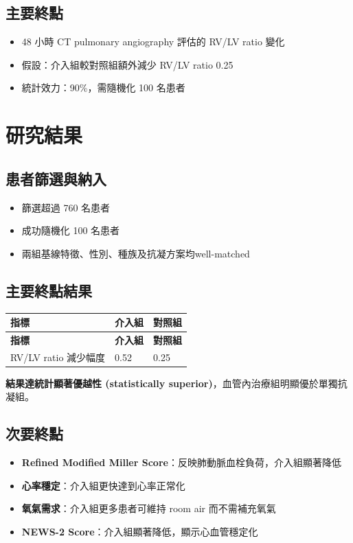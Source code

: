 \documentclass[12pt,a4paper]{article}
\begin{document}
\subsection{主要終點}
\begin{itemize}
    \item 48 小時 CT pulmonary angiography 評估的 RV/LV ratio 變化
    \item 假設：介入組較對照組額外減少 RV/LV ratio 0.25
    \item 統計效力：90\%，需隨機化 100 名患者
\end{itemize}

\section{研究結果}

\subsection{患者篩選與納入}
\begin{itemize}
    \item 篩選超過 760 名患者
    \item 成功隨機化 100 名患者
    \item 兩組基線特徵、性別、種族及抗凝方案均well-matched
\end{itemize}

\subsection{主要終點結果}

\begin{longtable}{p{6cm}p{4cm}p{4cm}}
\toprule
\textbf{指標} & \textbf{介入組} & \textbf{對照組} \\
\midrule
\endfirsthead
\toprule
\textbf{指標} & \textbf{介入組} & \textbf{對照組} \\
\midrule
\endhead
RV/LV ratio 減少幅度 & 0.52 & 0.25 \\
\bottomrule
\end{longtable}

\textbf{結果達統計顯著優越性 (statistically superior)}，血管內治療組明顯優於單獨抗凝組。

\subsection{次要終點}

\begin{itemize}
    \item \textbf{Refined Modified Miller Score}：反映肺動脈血栓負荷，介入組顯著降低
    \item \textbf{心率穩定}：介入組更快達到心率正常化
    \item \textbf{氧氣需求}：介入組更多患者可維持 room air 而不需補充氧氣
    \item \textbf{NEWS-2 Score}：介入組顯著降低，顯示心血管穩定化
\end{itemize}
\end{document}
